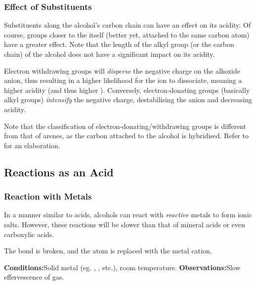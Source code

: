 			\subsubsection{Effect of Substituents}

				Substituents along the alcohol's carbon chain can have an effect on its acidity. Of course, groups closer to the 
				itself (better yet, attached to the same carbon atom) have a greater effect. Note that the length of the alkyl group
				(or the carbon chain) of the alcohol does not have a significant impact on its acidity.

				Electron withdrawing groups will \textit{disperse} the negative charge on the alkoxide anion, thus resulting in a higher
				likelihood for the  ion to dissociate, meaning a higher acidity (and thus higher \Ka). Conversely, electron-donating
				groups (basically alkyl groups) \textit{intensify} the negative charge, destabilising the anion and decreasing acidity.

				Note that the classification of electron-donating/withdrawing groups is different from that of arenes, as the carbon
				attached to the alcohol is \spthree hybridised. Refer to \hyperlink{CaveatResonanceTable}{} for an
				elaboration.



		\pagebreak
		\subsection{Reactions as an Acid}

			\subsubsection{Reaction with Metals}
				In a manner similar to acids, alcohols can react with \textit{reactive} metals to form ionic salts. However, these reactions
				will be slower than that of mineral acids or even carboxylic acids.

				The  bond is broken, and the  atom is replaced with the metal cation.


				\vspace{1.5em}
				\vbox{\textbf{Conditions:}\tabto{35mm}Solid metal (eg. , , etc.), room temperature.}
				\vbox{\textbf{Observations:}\tabto{35mm}Slow effervescence of  gas.}


